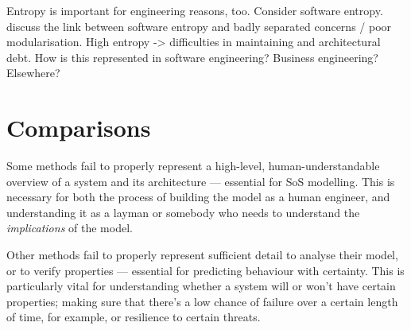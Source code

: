 Entropy is important for engineering reasons, too. Consider software entropy.
discuss the link between software entropy and badly separated concerns / poor modularisation.
High entropy -> difficulties in maintaining and architectural debt.
How is this represented in software engineering? Business engineering? Elsewhere?
\par


  

\section{Comparisons}

Some methods fail to properly represent a high-level, human-understandable overview of a system and its architecture --- essential for SoS modelling.
This is necessary for both the process of building the model as a human engineer, and understanding it as a layman or somebody who needs to understand the \emph{implications} of the model.
\par

Other methods fail to properly represent sufficient detail to analyse their model, or to verify properties --- essential for predicting behaviour with certainty.
This is particularly vital for understanding whether a system will or won't have certain properties; making sure that there's a low chance of failure over a certain length of time, for example, or resilience to certain threats.
\par
